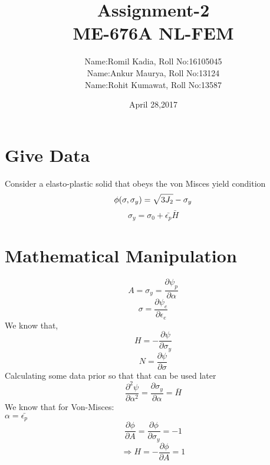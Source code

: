 \documentclass{article}
\title{Assignment-2 \\ ME-676A NL-FEM}
\author{Name:Romil Kadia, Roll No:16105045\\ Name:Ankur Maurya, Roll No:13124\\ Name:Rohit Kumawat, Roll No:13587}
\date{April 28,2017}
\begin{document}
\maketitle

\section*{Give Data}
Consider a elasto-plastic solid that obeys the von Misces yield condition
\begin{equation}
    \phi (\sigma , \sigma_{y}) = \sqrt{3 J_{2}} - \sigma_{y}\\
\end{equation}
\begin{equation}
    \sigma_{y} = \sigma_{0} + \bar{\epsilon_{p}} \bar{H}
\end{equation}
\section*{Mathematical Manipulation}
\begin{equation}
    A = \sigma_{y} = \frac{\partial \psi_{p}}{\partial \alpha}
\end{equation}
\begin{equation}
    \sigma=\frac{\partial \psi_{e}}{\partial \epsilon_{e}}
\end{equation}
We know that,
\begin{equation}
    H= - \frac{\partial \psi}{\partial \sigma_{y}}
\end{equation}
\begin{equation}
    N = \frac{\partial \psi}{\partial \sigma}
\end{equation}
Calculating some data prior so that that can be used later
\begin{equation}
    \frac{\partial^{2} \psi}{\partial \alpha^{2}}=\frac{\partial \sigma_{y}}{\partial \alpha} = \bar{H}
\end{equation}
We know that for Von-Misces:\\

$\alpha = \bar{\epsilon_{p}}$
\begin{equation}
    \frac{\partial \phi}{\partial A} = \frac{\partial \phi}{\partial \sigma_{y}}= -1
\end{equation}
\begin{equation}
    \Rightarrow H = - \frac{\partial \phi}{\partial A} = 1
\end{equation}
\pagebreak
\end{document}
